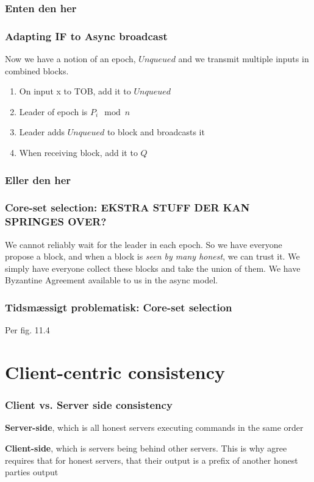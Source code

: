\documentclass[14pt]{beamer}
\begin{document}
        \subsubsection{Enten den her}
            \begin{frame}
                \frametitle{Adapting IF to Async broadcast}
                    Now we have a notion of an epoch, $Unqueued$ and we transmit multiple inputs in combined blocks. 
                    \begin{enumerate}
                        \item On input x to TOB, add it to $Unqueued$
                        \item Leader of epoch is $P_i \mod n$ 
                        \item Leader adds $Unqueued$ to block and broadcasts it
                        \item When receiving block, add it to $Q$
                    \end{enumerate}
            \end{frame}
        \subsubsection{Eller den her}
            \begin{frame}
                \frametitle{Core-set selection: EKSTRA STUFF DER KAN SPRINGES OVER?}
                    We cannot reliably wait for the leader in each epoch. So we have everyone propose a block, and when a block is \textit{seen by many honest}, we can trust it. We simply have everyone collect these blocks and take the union of them. We have Byzantine Agreement available to us in the async model. 
            \end{frame}
            \begin{frame}
                \frametitle{Tidsmæssigt problematisk: Core-set selection}
                    Per fig. 11.4
                
            \end{frame}

\section{Client-centric consistency}
    \begin{frame}
        \frametitle{Client vs. Server side consistency}
        \textbf{Server-side}, which is all honest servers executing commands in the same order
        
        \textbf{Client-side}, which is servers being behind other servers. This is why agree requires that for honest servers, that their output is a prefix of another honest parties output
    \end{frame}
\end{document}
